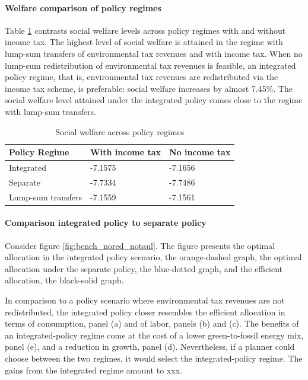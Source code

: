 \paragraph{Welfare comparison of policy regimes}
Table \ref{tab:swf} contrasts social welfare levels across policy regimes with and without income tax. The highest level of social welfare is attained in the regime with lump-sum transfers of environmental tax revenues and with income tax. When no lump-sum redistribution of environmental tax revenues is feasible, an integrated policy regime, that is, environmental tax revenues are redistributed via the income tax scheme, is preferable: social welfare increases by almost 7.45\%.  The social welfare level attained under the integrated policy comes close to the regime with lump-sum transfers. 
\begin{table}\caption{Social welfare across policy regimes}\label{tab:swf}
\begin{tabular}{l|ll}
	Policy Regime & With income tax & No income tax\\ 
	\hline 
	Integrated&-7.1575 & -7.1656\\
	Separate & -7.7334 & -7.7486 \\
	Lump-sum transfers & -7.1559 & -7.1561\\
	\hline 
\end{tabular}
\end{table}
\paragraph{Comparison integrated policy to separate policy}

Consider figure \ref{fig:bench_nored_notaul}. The figure presents the optimal allocation in the integrated policy scenario,  the orange-dashed graph, the optimal allocation under the separate policy, the blue-dotted graph, and the efficient allocation, the black-solid graph.

In comparison to a policy scenario where environmental tax revenues are not redistributed, the integrated policy closer resembles the efficient allocation in terms of consumption, panel (a) and of labor, panels (b) and (c). %
The benefits of an integrated-policy regime come at the cost of a lower green-to-fossil energy mix, panel (e), and a reduction in growth, panel (d). Nevertheless, if a planner could choose between the two regimes, it would select the integrated-policy regime. The gains from the integrated regime amount to xxx. 

